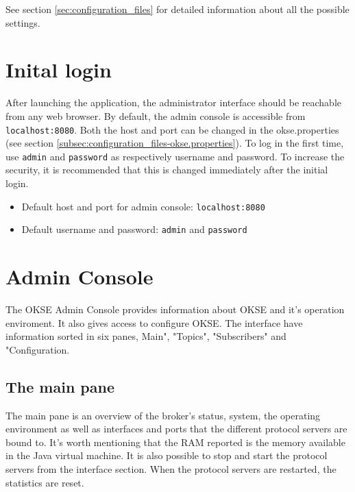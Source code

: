 \noindent See section \ref{sec:configuration_files} for detailed information about all the possible settings.

\section{Inital login}
\label{sec:inital-login}

After launching the application, the administrator interface should be reachable from any web browser. By default, the admin console is accessible from \verb!localhost:8080!. Both the host and port can be changed in the okse.properties (see section \ref{subsec:configuration_files-okse.properties}). To log in the first time, use \verb!admin! and \verb!password! as respectively username and password. To increase the security, it is recommended that this is changed immediately after the initial login. 

\begin{itemize}
\setlength{\itemsep}{0cm}%
\item Default host and port for admin console: \verb!localhost:8080!
\item Default username and password: \verb!admin! and \verb!password!
\end{itemize}

\section{Admin Console}
The OKSE Admin Console provides information about OKSE and it's operation enviroment. It also gives access to configure OKSE. The interface have information sorted in six panes, Main", "Topics", "Subscribers" and "Configuration.

\subsection{The main pane}
The main pane is an overview of the broker's status, system, the operating environment as well as interfaces and ports that the different protocol servers are bound to. It's worth mentioning that the RAM reported is the memory available in the Java virtual machine. It is also possible to stop and start the protocol servers from the interface section. When the protocol servers are restarted, the statistics are reset.

